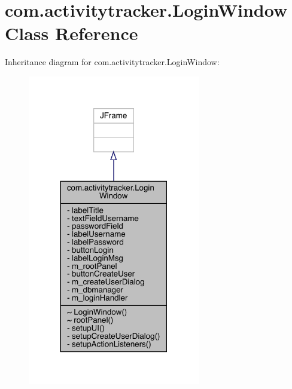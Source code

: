 \hypertarget{classcom_1_1activitytracker_1_1_login_window}{}\section{com.\+activitytracker.\+Login\+Window Class Reference}
\label{classcom_1_1activitytracker_1_1_login_window}


Inheritance diagram for com.\+activitytracker.\+Login\+Window\+:
\nopagebreak
\begin{figure}[H]
\begin{center}
\leavevmode
\includegraphics[width=213pt]{classcom_1_1activitytracker_1_1_login_window__inherit__graph}
\end{center}
\end{figure}


